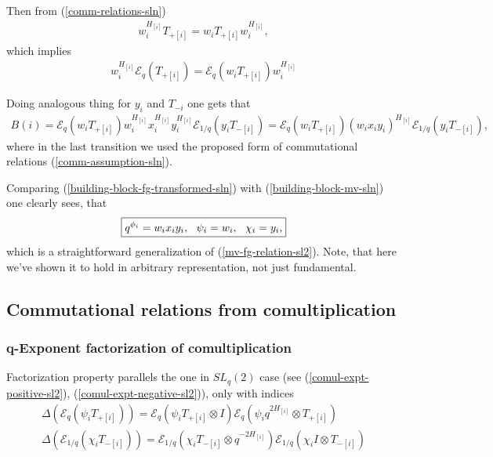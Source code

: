 \documentclass{article}
\newcommand{\lb}{\left (}
\newcommand{\rb}{\right )}
\newcommand{\B}[1]{\lb #1 \rb}
\newcommand{\lsb}{\left [}
\newcommand{\rsb}{\right ]}
\newcommand{\SB}[1]{\lsb #1 \rsb}
\newcommand{\be}{\begin{eqnarray}}
\newcommand{\ee}{\end{eqnarray}}
\newcommand {\?}{\textit{???}}
\newcommand{\me}[0]{\mathcal{E}}
\newcommand{\Tp}[1][]{T_{+ #1}}
\newcommand{\Tm}[1][]{T_{- #1}}
\newcommand{\leftFactor}[2]{#1[#2] \otimes I}
\newcommand{\rightFactor}[2]{I \otimes #1[#2]}
\newcommand{\leftTwistFactor}[2]{#1[#2] \otimes q^{-2H_{#2}}}
\newcommand{\rightTwistFactor}[2]{q^{2H_{#2}} \otimes #1[#2]}
\newcommand{\comul}[1]{\Delta \lb #1 \rb}
\newcommand{\delabel}[1]{(\ref{#1})}
\begin{document}
Then from \delabel{comm-relations-sln}
\be
w_i^{H_{[i]}} \Tp[\SB{i}] = w_i \Tp[\SB{i}] w_i^{H_{[i]}},
\ee
which implies
\be
w_i^{H_{[i]}} \me_q \B{\Tp[\SB{i}]} = \me_q \B{w_i \Tp[\SB{i}]} w_i^{H_{[i]}}
\ee

Doing analogous thing for $y_i$ and $\Tm[i]$ one gets that
\be
\label{building-block-fg-transformed-sln}
B(i) = \me_q \B{w_i \Tp[\SB{i}]} w_i^{H_{[i]}} x_i^{H_{[i]}} y_i^{H_{[i]}} \me_{1/q} \B{y_i \Tm[\SB{i}]}
= \me_q \B{w_i \Tp[\SB{i}]} \B{w_i x_i y_i}^{H_{[i]}} \me_{1/q} \B{y_i \Tm[\SB{i}]},
\ee
where in the last transition we used the proposed form of commutational relations \delabel{comm-assumption-sln}.

Comparing \delabel{building-block-fg-transformed-sln}
with \delabel{building-block-mv-sln} one clearly sees, that
\begin{equation}
  \boxed {
    \label{mv-fg-relation-sln}
    q^{\phi_i} = w_i x_i y_i, \ \ \psi_i = w_i,\ \ \chi_i = y_i,
  }
\end{equation}
which is a straightforward generalization of \delabel{mv-fg-relation-sl2}. Note, that here we've shown it
to hold in arbitrary representation, not just fundamental.

\subsection{Commutational relations from comultiplication}
\subsubsection{q-Exponent factorization of comultiplication}
Factorization property parallels the one in $SL_q(2)$ case
(see \delabel{comul-expt-positive-sl2}, \delabel{comul-expt-negative-sl2}),
only with indices
\be
\label{comul-expt-positive-sln}
\comul{\me_q \B{\psi_i \Tp[\SB{i}]}} =
\me_q \B{\psi_i \leftFactor{\Tp}{\SB{i}}}
\me_q \B{\psi_i \rightTwistFactor{\Tp}{\SB{i}}} \\
\label{comul-expt-negative-sln}
\comul{\me_{1/q} \B{\chi_i \Tm[\SB{i}]}} =
\me_{1/q} \B{\chi_i \leftTwistFactor{\Tm}{\SB{i}}}
\me_{1/q} \B{\chi_i \rightFactor{\Tm}{\SB{i}}}
\ee
\end{document}
